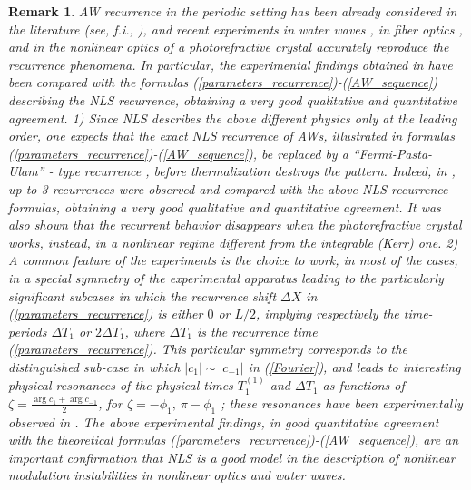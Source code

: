 \documentclass[12pt]{article}
\newtheorem{remark}{Remark}
\begin{document}
\begin{remark}
  AW recurrence in the periodic setting has been already considered in the literature (see, f.i., \cite{Yuen1,Yuen2,Yuen3,Akhmed3,Simaeys,Kuznetsov2}), and recent experiments in water waves \cite{Onor}, in fiber optics \cite{trillo}, and in the nonlinear optics of a photorefractive crystal \cite{PieranFZMAGSCDR} accurately reproduce the recurrence phenomena. In particular, the experimental findings obtained in \cite{PieranFZMAGSCDR} have been compared with the formulas (\ref{parameters_recurrence})-(\ref{AW_sequence}) describing the NLS recurrence, obtaining a very good qualitative and quantitative agreement. 1) Since NLS describes the above different physics only at the leading order, one expects that the exact NLS recurrence of AWs, illustrated in formulas (\ref{parameters_recurrence})-(\ref{AW_sequence}), be replaced by a ``Fermi-Pasta-Ulam'' - type recurrence \cite{Fermi_Pasta_Ulam}, before thermalization destroys the pattern. Indeed, in \cite{PieranFZMAGSCDR}, up to 3 recurrences were observed and compared with the above NLS recurrence formulas, obtaining a very good qualitative and quantitative agreement. It was also shown that the recurrent behavior disappears when the photorefractive crystal works, instead, in a nonlinear regime different from the integrable (Kerr) one. 2) A common feature of the experiments \cite{Onor,trillo,PieranFZMAGSCDR} is the choice to work, in most of the cases, in a special symmetry of the experimental apparatus leading to the particularly significant subcases in which the recurrence shift $\Delta X$ in (\ref{parameters_recurrence}) is either $0$ or $L/2$, implying respectively the time-periods $\Delta T_1$ or $2 \Delta T_1$, where $\Delta T_1$ is the recurrence time (\ref{parameters_recurrence}). This particular symmetry corresponds to the distinguished sub-case in which $|c_1|\sim |c_{-1}|$ in (\ref{Fourier}), and leads to interesting physical resonances of the physical times $T^{(1)}_1$ and $\Delta T_1$ as functions of $\zeta=\frac{\arg c_1 +\arg c_{-1}}{2}$, for $\zeta=-\phi_1,~\pi-\phi_1$ \cite{GS4}; these resonances have been experimentally observed in \cite{PieranFZMAGSCDR}. The above experimental findings, in good quantitative agreement with the theoretical formulas (\ref{parameters_recurrence})-(\ref{AW_sequence}), are an important confirmation that NLS is a good model in the description of nonlinear modulation instabilities in nonlinear optics and water waves. 
\end{remark}
\end{document}
